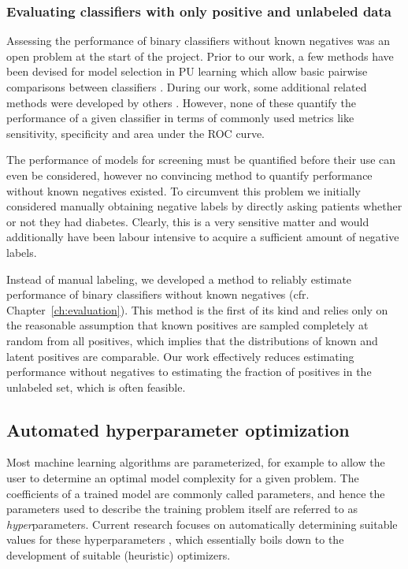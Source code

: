 \subsubsection{Evaluating classifiers with only positive and unlabeled data} 
Assessing the performance of binary classifiers without known negatives was an open problem at the start of the project. Prior to our work, a few methods have been devised for model selection in PU learning which allow basic pairwise comparisons between classifiers \citep{lee2003learning}. During our work, some additional related methods were developed by others \citep{sechidis2014statistical, hajizadeh2014evaluating}. However, none of these quantify the performance of a given classifier in terms of commonly used metrics like sensitivity, specificity and area under the ROC curve.

The performance of models for screening must be quantified before their use can even be considered, however no convincing method to quantify performance without known negatives existed. To circumvent this problem we initially considered manually obtaining negative labels by directly asking patients whether or not they had diabetes. Clearly, this is a very sensitive matter and would additionally have been labour intensive to acquire a sufficient amount of negative labels. 

Instead of manual labeling, we developed a method to reliably estimate performance of binary classifiers without known negatives (cfr. Chapter~\ref{ch:evaluation}). This method is the first of its kind and relies only on the reasonable assumption that known positives are sampled completely at random from all positives, which implies that the distributions of known and latent positives are comparable. Our work effectively reduces estimating performance without negatives to estimating the fraction of positives in the unlabeled set, which is often feasible.

\subsection{Automated hyperparameter optimization} \label{intro:tuning}
Most machine learning algorithms are parameterized, for example to allow the user to determine an optimal model complexity for a given problem. The coefficients of a trained model are commonly called parameters, and hence the parameters used to describe the training problem itself are referred to as \emph{hyper}parameters. Current research focuses on automatically determining suitable values for these hyperparameters \citep{hutter2009paramils, bergstra2011algorithms, snoek2012practical, bergstra2012random, bergstra2013hyperopt, eggensperger2013towards, thornton2013auto}, which essentially boils down to the development of suitable (heuristic) optimizers.

